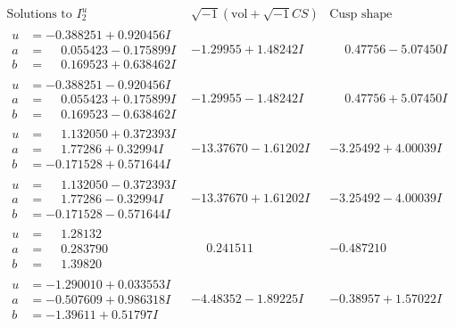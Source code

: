 \documentclass[1p]{elsarticle_modified}
\theoremstyle{definition}
\newcommand{\I}{\sqrt{-1}}
\begin{document}
$$\begin{array}{c|c|c}  
\text{Solutions to }I^u_{2}& \I (\text{vol} + \sqrt{-1}CS) & \text{Cusp shape}\\
 \hline 
\begin{aligned}
u &= -0.388251 + 0.920456 I \\
a &= \phantom{-}0.055423 - 0.175899 I \\
b &= \phantom{-}0.169523 + 0.638462 I\end{aligned}
 & -1.29955 + 1.48242 I & \phantom{-}0.47756 - 5.07450 I \\ \hline\begin{aligned}
u &= -0.388251 - 0.920456 I \\
a &= \phantom{-}0.055423 + 0.175899 I \\
b &= \phantom{-}0.169523 - 0.638462 I\end{aligned}
 & -1.29955 - 1.48242 I & \phantom{-}0.47756 + 5.07450 I \\ \hline\begin{aligned}
u &= \phantom{-}1.132050 + 0.372393 I \\
a &= \phantom{-}1.77286 + 0.32994 I \\
b &= -0.171528 + 0.571644 I\end{aligned}
 & -13.37670 - 1.61202 I & -3.25492 + 4.00039 I \\ \hline\begin{aligned}
u &= \phantom{-}1.132050 - 0.372393 I \\
a &= \phantom{-}1.77286 - 0.32994 I \\
b &= -0.171528 - 0.571644 I\end{aligned}
 & -13.37670 + 1.61202 I & -3.25492 - 4.00039 I \\ \hline\begin{aligned}
u &= \phantom{-}1.28132\phantom{ +0.000000I} \\
a &= \phantom{-}0.283790\phantom{ +0.000000I} \\
b &= \phantom{-}1.39820\phantom{ +0.000000I}\end{aligned}
 & \phantom{-}0.241511\phantom{ +0.000000I} & -0.487210\phantom{ +0.000000I} \\ \hline\begin{aligned}
u &= -1.290010 + 0.033553 I \\
a &= -0.507609 + 0.986318 I \\
b &= -1.39611 + 0.51797 I\end{aligned}
 & -4.48352 - 1.89225 I & -0.38957 + 1.57022 I \\ \hline\begin{aligned}

\end{aligned}
\end{array}$$
\end{document}
